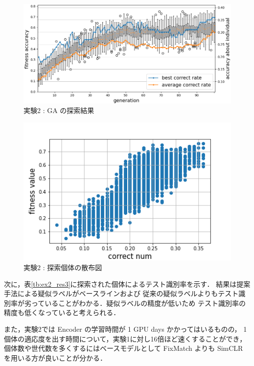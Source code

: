 \begin{figure}[h]
	\begin{center}
		\includegraphics[scale=0.70]{./images/ex2_res_graph.png}
		\caption{実験2 : GA の探索結果\label{fig:ex2_res1}}
	\end{center}
\end{figure}


\begin{figure}[h]
	\begin{center}
		\includegraphics[scale=1.0]{./images/ex2_res_img.png}
		\caption{実験2 : 探索個体の散布図\label{fig:ex2_res2}}
	\end{center}
\end{figure}


次に，表\ref{tb:ex2_res3}に探索された個体によるテスト識別率を示す．
結果は提案手法による疑似ラベルがベースラインおよび
従来の疑似ラベルよりもテスト識別率が劣っていることがわかる．疑似ラベルの精度が低いため
テスト識別率の精度も低くなっていると考えられる．

\begin{table}[h]
	\centering
	\caption{実験2 : テスト識別率\label{tb:ex2_res3}}
\end{table}

また，実験2では Encoder の学習時間が 1 GPU days かかってはいるものの，
1個体の適応度を出す時間について，実験1に対し16倍ほど速くすることができ，
個体数や世代数を多くするにはベースモデルとして FixMatch よりも SimCLR を用いる方が良いことが分かる．
